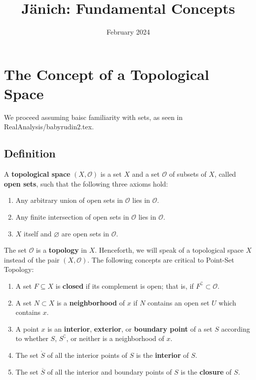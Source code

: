\documentclass[11pt]{article}
\title{Jänich: Fundamental Concepts}
\author{February 2024}
\renewcommand{\O}{\mathcal{O}}
\begin{document}
\maketitle
\tableofcontents
\newpage


\section{The Concept of a Topological Space}

We proceed assuming baisc familiarity with sets, as seen in RealAnalysis/babyrudin2.tex.


\subsection{Definition}

A \textbf{topological space} $(X, \O)$ is a set $X$ and a set $\O$ of subsets of $X$, called \textbf{open sets}, such that the following three axioms hold:
\begin{enumerate}
  \item Any arbitrary union of open sets in $\O$ lies in $\O$.
  \item Any finite intersection of open sets in $\O$ lies in $\O$.
  \item $X$ itself and $\varnothing$ are open sets in $\O$.
\end{enumerate}
The set $\O$ is a \textbf{topology} in $X$. Henceforth, we will speak of a topological space $X$ instead of the pair $(X, \O)$. The following concepts are critical to Point-Set Topology:
\begin{enumerate}
  \item A set $F \subseteq X$ is \textbf{closed} if its complement is open; that is, if $F^{\complement} \subset \O$.
  \item A set $N \subset X$ is a \textbf{neighborhood} of $x$ if $N$ contains an open set $U$ which contains $x$.
  \item A point $x$ is an \textbf{interior}, \textbf{exterior}, or \textbf{boundary point} of a set $S$ according to whether $S$, $S^{\complement}$, or neither is a neighborhood of $x$.
  \item The set $\mathring{S}$ of all the interior points of $S$ is the \textbf{interior} of $S$.
  \item The set $\overline{S}$ of all the interior and boundary points of $S$ is the \textbf{closure} of $S$.
\end{enumerate}
\end{document}
